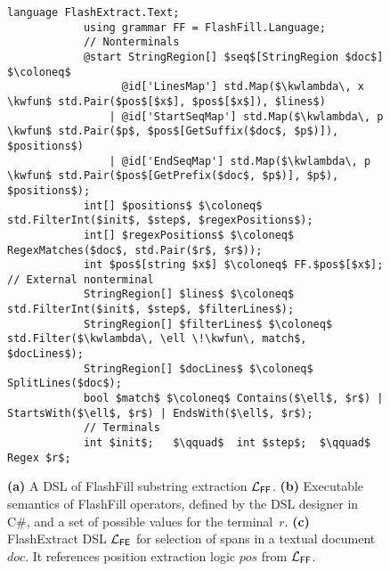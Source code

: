 \begin{figure}[p!]
\begin{fullpage}
        \begin{lstlisting}[language=dsl,gobble=12,morekeywords={StringRegion,Regex}]
            language FlashExtract.Text;
            using grammar FF = FlashFill.Language;
            // Nonterminals
            @start StringRegion[] $seq$[StringRegion $doc$] $\coloneq$
                  @id['LinesMap'] std.Map($\kwlambda\, x \kwfun$ std.Pair($pos$[$x$], $pos$[$x$]), $lines$)
                | @id['StartSeqMap'] std.Map($\kwlambda\, p \kwfun$ std.Pair($p$, $pos$[GetSuffix($doc$, $p$)]), $positions$)
                | @id['EndSeqMap'] std.Map($\kwlambda\, p \kwfun$ std.Pair($pos$[GetPrefix($doc$, $p$)], $p$), $positions$);
            int[] $positions$ $\coloneq$ std.FilterInt($init$, $step$, $regexPositions$);
            int[] $regexPositions$ $\coloneq$ RegexMatches($doc$, std.Pair($r$, $r$));
            int $pos$[string $x$] $\coloneq$ FF.$pos$[$x$];  // External nonterminal
            StringRegion[] $lines$ $\coloneq$ std.FilterInt($init$, $step$, $filterLines$);
            StringRegion[] $filterLines$ $\coloneq$ std.Filter($\kwlambda\, \ell \!\kwfun\, match$, $docLines$);
            StringRegion[] $docLines$ $\coloneq$ SplitLines($doc$);
            bool $match$ $\coloneq$ Contains($\ell$, $r$) | StartsWith($\ell$, $r$) | EndsWith($\ell$, $r$);
            // Terminals
            int $init$;   $\qquad$  int $step$;  $\qquad$  Regex $r$;
        \end{lstlisting}
        \caption{\textbf{(a)} A DSL of FlashFill substring extraction $\mathcal{L}_{\mathsf{FF}}$.
            \textbf{(b)} Executable semantics of FlashFill operators, defined by the DSL designer in C\#, and
            a set of possible values for the terminal~$r$.
            \textbf{(c)}
            FlashExtract DSL $\mathcal{L}_{\mathsf{FE}}$ for selection of spans in a textual document $doc$.
        It references position extraction logic $pos$ from $\mathcal{L}_{\mathsf{FF}}$. }
        \label{fig:dsl:flashfill}
    \end{fullpage}
\end{figure}

